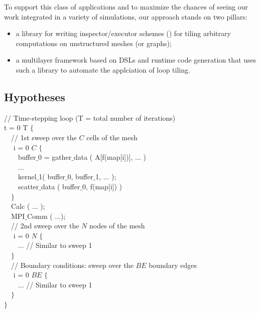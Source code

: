 To support this class of applications and to maximize the chances of seeing our work integrated in a variety of simulations, our approach stands on two pillars:
\begin{itemize}
\item a library for writing inspector/executor schemes (\cite{IEscheme}) for tiling arbitrary computations on unstructured meshes (or graphs);
\item a multilayer framework based on DSLs and runtime code generation that uses such a library to automate the applciation of loop tiling.
\end{itemize}

\subsection{Hypotheses}
\label{sec:tiling:struct}

\begin{algorithm}
\scriptsize\ttfamily
{}

// Time-stepping loop (T = total number of iterations)\\
 t = 0  T $\lbrace$\\
~~// 1st sweep over the $C$ cells of the mesh\\
~~ i = 0  $C$ $\lbrace$\\
~~~~buffer$\_$0 = gather$\_$data ( A[f(map[i])], ... )\\
~~~~...\\
~~~~kernel$\_$1( buffer$\_$0, buffer$\_$1, ... );\\
~~~~scatter$\_$data ( buffer$\_$0, f(map[i]) )\\
~~$\rbrace$\\
~~Calc ( ... );\\
~~MPI$\_$Comm ( ...); \\
~~// 2nd sweep over the $N$ nodes of the mesh\\
~~ i = 0  $N$ $\lbrace$\\
~~~~... // Similar to sweep 1 \\
~~$\rbrace$\\
~~// Boundary conditions: sweep over the $BE$ boundary edges\\
~~ i = 0  $BE$ $\lbrace$\\
~~~~... // Similar to sweep 1 \\
~~$\rbrace$\\
$\rbrace$
\caption{....}
\label{code:tiling-struct}
\end{algorithm}

